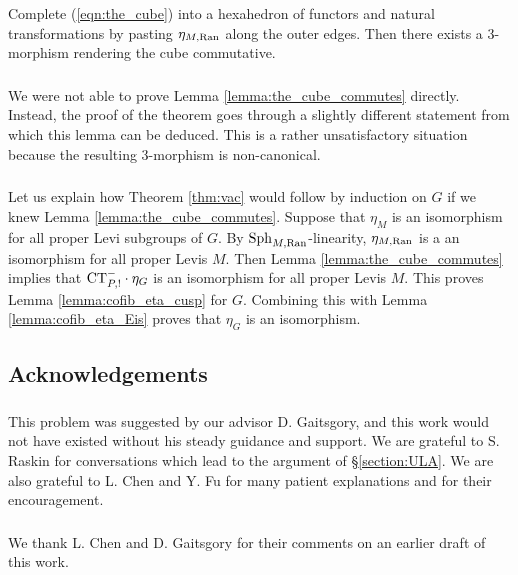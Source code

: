 \begin{lemma}
\label{lemma:the_cube_commutes}
Complete (\ref{eqn:the_cube}) into a hexahedron of functors and natural transformations by pasting $\eta_{M,\mathrm{Ran}}$ along the outer edges. Then there exists a 3-morphism rendering the cube commutative.
\end{lemma}

\subsubsection{} We were not able to prove Lemma \ref{lemma:the_cube_commutes} directly. Instead, the proof of the theorem goes through a slightly different statement from which this lemma can be deduced. This is a rather unsatisfactory situation because the resulting 3-morphism is non-canonical.

\subsubsection{} Let us explain how Theorem \ref{thm:vac} would follow by induction on $G$ if we knew Lemma \ref{lemma:the_cube_commutes}. Suppose that $\eta_M$ is an isomorphism for all proper Levi subgroups of $G$. By $\mathrm{Sph}_{M,\mathrm{Ran}}$-linearity, $\eta_{M,\mathrm{Ran}}$ is a an isomorphism for all proper Levis $M$. Then Lemma \ref{lemma:the_cube_commutes} implies that $\mathrm{CT}_{P,!}^- \cdot \eta_G$ is an isomorphism for all proper Levis $M$. This proves Lemma \ref{lemma:cofib_eta_cusp} for $G$. Combining this with Lemma \ref{lemma:cofib_eta_Eis} proves that $\eta_G$ is an isomorphism.

\subsection{Acknowledgements}

\subsubsection{} This problem was suggested by our advisor D. Gaitsgory, and this work would not have existed without his steady guidance and support. We are grateful to S. Raskin for conversations which lead to the argument of \S\ref{section:ULA}. We are also grateful to L. Chen and Y. Fu for many patient explanations and for their encouragement.

\subsubsection{} We thank L. Chen and D. Gaitsgory for their comments on an earlier draft of this work.